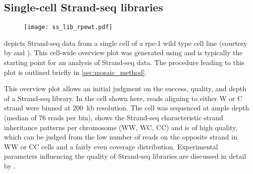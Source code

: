 \subsection{Single-cell Strand-seq libraries}

    \begin{figure}[t!]                                             %
        \captionsetup{type=figure}
        \texttt{[image: ss\_lib\_rpewt.pdf]}
    \end{figure}

 depicts Strand-seq data from a single cell of a \acf{rpe}-1
wild type cell line (courtesy by \balca and \landsdorp). This cell-wide overview
plot was generated using \mc and is typically the starting point for
an analysis of Strand-seq data. The procedure leading to this plot is outlined
briefly in \cref{sec:mosaic_method}.

This overview plot allows an initial judgment on the success, quality, and depth
of a Strand-seq library. In the cell shown here, reads aligning to either W or C
strand were binned at 200~kb resolution. The cell was sequenced at ample depth
(median of 76 reads per bin), shows the Strand-seq characteristic strand
inheritance patterns per chromosome (WW, WC, CC) and is of high quality, which
can be judged from the low number of reads on the opposite strand in WW or CC
cells and a fairly even coverage distribution. Experimental parameters
influencing the quality of Strand-seq libraries are discussed in detail by
\citet{Sanders2017}.

